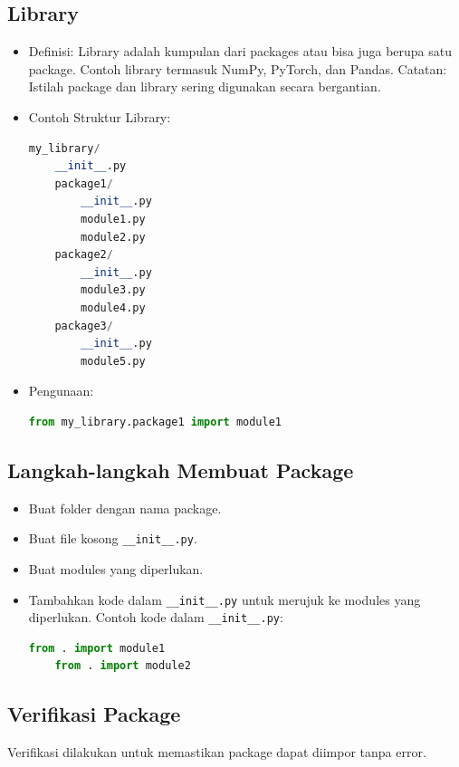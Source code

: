 \documentclass{article}
\begin{document}
\subsection{Library}
\begin{itemize}
    \item Definisi: Library adalah kumpulan dari packages atau bisa juga berupa satu package. Contoh library termasuk NumPy, PyTorch, dan Pandas. Catatan: Istilah package dan library sering digunakan secara bergantian.
    \item Contoh Struktur Library:
          \begin{lstlisting}[language=Python, caption={}, captionpos=b]
    my_library/
    __init__.py
    package1/
        __init__.py
        module1.py
        module2.py
    package2/
        __init__.py
        module3.py
        module4.py
    package3/
        __init__.py
        module5.py
    \end{lstlisting}
    \item Pengunaan:
          \begin{lstlisting}[language=Python, caption={}, captionpos=b]
    from my_library.package1 import module1
    \end{lstlisting}
\end{itemize}

\subsection{Langkah-langkah Membuat Package}
\begin{itemize}
    \item Buat folder dengan nama package.
    \item Buat file kosong \verb|__init__.py|.
    \item Buat modules yang diperlukan.
    \item Tambahkan kode dalam \verb|__init__.py| untuk merujuk ke modules yang diperlukan. Contoh kode dalam \verb|__init__.py|:
          \begin{lstlisting}[language=Python, caption={}, captionpos=b]
    from . import module1
    from . import module2
\end{lstlisting}
\end{itemize}

\subsection{Verifikasi Package}
Verifikasi dilakukan untuk memastikan package dapat diimpor tanpa error.
\end{document}
